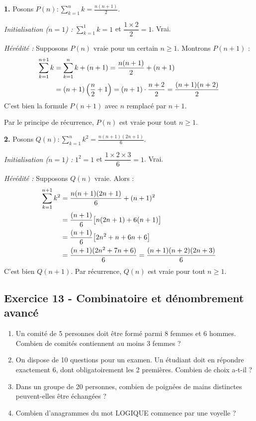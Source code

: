 \documentclass[12pt,a4paper]{article}
\begin{document}
\begin{boitecorrige}
\textbf{1.} Posons $P(n) : \displaystyle\sum_{k=1}^{n} k = \frac{n(n+1)}{2}$.

\textit{Initialisation ($n=1$) :} $\displaystyle\sum_{k=1}^{1} k = 1$ et $\dfrac{1\times2}{2} = 1$. Vrai.

\textit{Hérédité :} Supposons $P(n)$ vraie pour un certain $n\geq1$. Montrons $P(n+1)$ :
\begin{align}
\sum_{k=1}^{n+1} k &= \sum_{k=1}^{n} k + (n+1) = \frac{n(n+1)}{2} + (n+1) \notag \\
&= (n+1)\left(\frac{n}{2}+1\right) = (n+1)\cdot\frac{n+2}{2} = \frac{(n+1)(n+2)}{2}
\end{align}
C'est bien la formule $P(n+1)$ avec $n$ remplacé par $n+1$.

Par le principe de récurrence, $P(n)$ est vraie pour tout $n\geq1$.

\textbf{2.} Posons $Q(n) : \displaystyle\sum_{k=1}^{n} k^2 = \frac{n(n+1)(2n+1)}{6}$.

\textit{Initialisation ($n=1$) :} $1^2 = 1$ et $\dfrac{1\times2\times3}{6} = 1$. Vrai.

\textit{Hérédité :} Supposons $Q(n)$ vraie. Alors :
\begin{align}
\sum_{k=1}^{n+1} k^2 &= \frac{n(n+1)(2n+1)}{6} + (n+1)^2 \notag \\
&= \frac{(n+1)}{6}\bigl[n(2n+1) + 6(n+1)\bigr] \notag \\
&= \frac{(n+1)}{6}\bigl[2n^2+n+6n+6\bigr] \notag \\
&= \frac{(n+1)(2n^2+7n+6)}{6} = \frac{(n+1)(n+2)(2n+3)}{6}
\end{align}
C'est bien $Q(n+1)$. Par récurrence, $Q(n)$ est vraie pour tout $n\geq1$.
\end{boitecorrige}

\subsection*{Exercice 13 - Combinatoire et dénombrement avancé \niveau{\moyen}}

\begin{boiteexercice}
\begin{enumerate}
  \item Un comité de 5 personnes doit être formé parmi 8 femmes et 6 hommes. Combien de comités contiennent au moins 3 femmes ?
  \item On dispose de 10 questions pour un examen. Un étudiant doit en répondre exactement 6, dont obligatoirement les 2 premières. Combien de choix a-t-il ?
  \item Dans un groupe de 20 personnes, combien de poignées de mains distinctes peuvent-elles être échangées ?
  \item Combien d'anagrammes du mot \og LOGIQUE \fg{} commence par une voyelle ?
\end{enumerate}
\end{boiteexercice}
\end{document}
